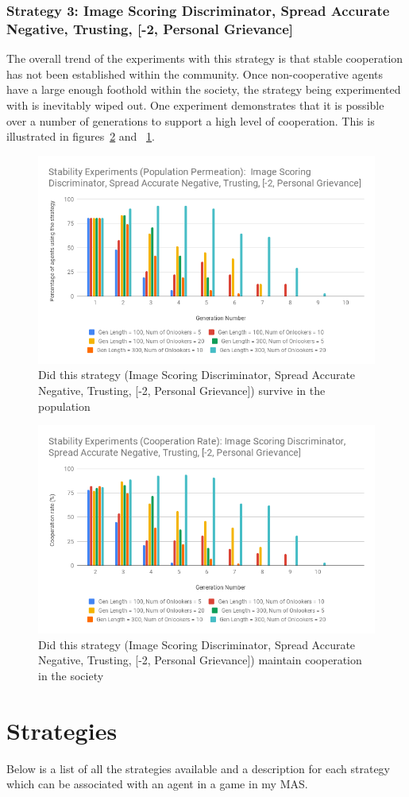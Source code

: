 \documentclass[]{final_report}
\begin{document}
\subsubsection{Strategy 3: Image Scoring Discriminator, Spread Accurate Negative, Trusting, [-2, Personal Grievance]}
The overall trend of the experiments with this strategy is that stable cooperation has not been established within the community. Once non-cooperative agents have a large enough foothold within the society, the strategy being experimented with is inevitably wiped out. One experiment demonstrates that it is possible over a number of generations to support a high level of cooperation. This is illustrated in figures~\ref{fig:isdsant-2pgCoop}
and ~\ref{fig:isdsant-2pgPop}.\begin{figure}
\begin{framed}
	\includegraphics[width=\textwidth]{isdsant-2pgPop.png}
	\caption{Did this strategy (Image Scoring Discriminator, Spread Accurate Negative, Trusting, [-2, Personal Grievance]) survive in the population}
	\label{fig:isdsant-2pgPop}
\end{framed}
\end{figure}
\begin{figure}
\begin{framed}
	\includegraphics[width=\textwidth]{isdsant-2pgCoop.png}
	\caption{Did this strategy (Image Scoring Discriminator, Spread Accurate Negative, Trusting, [-2, Personal Grievance]) maintain cooperation in the society}
	\label{fig:isdsant-2pgCoop}
\end{framed}
\end{figure}
\newpage

\section{Strategies}
\label{appendix:strats}
Below is a list of all the strategies available and a description for each strategy which can be associated with an agent in a game in my MAS.
\inputminted[breaklines]{json}{strategies.json}
\end{document}
